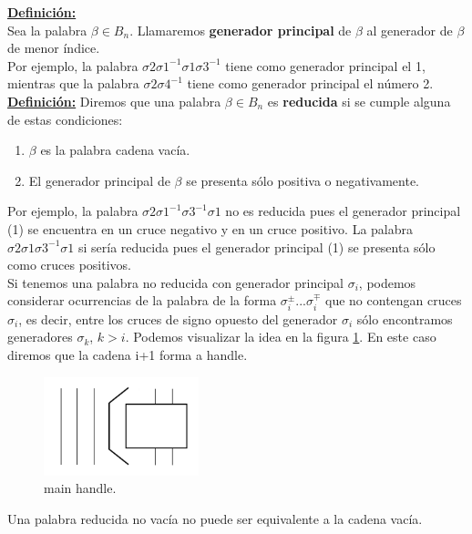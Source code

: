 \underline{\textbf{Definición:}}\\
Sea la palabra $\beta \in B_{n}$. Llamaremos \textbf{generador principal} de $\beta$ al generador de $\beta$ de menor índice.\\

Por ejemplo, la palabra $\sigma2\sigma1^{-1}\sigma1\sigma3^{-1}$ tiene como generador principal el 1, mientras que la palabra $\sigma2\sigma4^{-1}$ tiene como generador principal el número 2. \\

\textbf{\underline{Definición:}}
Diremos que una palabra $\beta \in B_{n}$ es \textbf{reducida} si se cumple alguna de estas condiciones:
\begin{enumerate}

	\item $\beta$ es la palabra cadena vacía.
	\item El generador principal de $\beta$ se presenta sólo positiva o negativamente. 
\end{enumerate}
 
Por ejemplo, la palabra $\sigma2\sigma1^{-1}\sigma3^{-1}\sigma1$ no es reducida pues el generador principal (1) se encuentra en un cruce negativo y en un cruce positivo. La palabra $\sigma2\sigma1\sigma3^{-1}\sigma1$ si sería reducida pues el generador principal (1) se presenta sólo como cruces positivos.\\

Si tenemos una palabra no reducida con generador principal $ \sigma_{i} $, podemos considerar ocurrencias de la palabra de la forma $ \sigma_{i}^{\pm} ... \sigma_{i}^{\mp} $ que no contengan cruces $ \sigma_{i} $, es decir, entre los cruces de signo opuesto del generador $ \sigma_{i} $ sólo encontramos generadores $ \sigma_{k} $, $ k>i $. Podemos visualizar la idea en la figura \ref{h1}. En este caso diremos que la cadena i+1 forma a handle.\\
\begin{figure}[h!]
	\centering
	\includegraphics[width=4.5cm]{itrenzas/h11.png}
	\caption{main handle.}
	\label{h1} 
\end{figure}

\begin{pro}
	Una palabra reducida no vacía no puede ser equivalente a la cadena vacía.
\end{pro}


